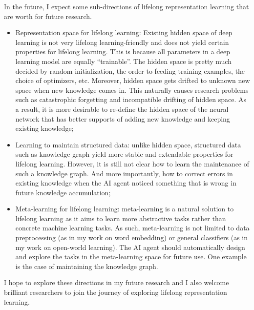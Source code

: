 \documentclass{uicthesi}
\newcounter{problem}
\begin{document}
In the future, I expect some sub-directions of lifelong representation learning that are worth for future research.
\begin{itemize}
\item Representation space for lifelong learning: 
Existing hidden space of deep learning is not very lifelong learning-friendly and does not yield certain properties for lifelong learning. 
This is because all parameters in a deep learning model are equally ``trainable''.
The hidden space is pretty much decided by random initialization, the order to feeding training examples, the choice of optimizers, etc.
Moreover, hidden space gets drifted to unknown new space when new knowledge comes in.
This naturally causes research problems such as catastrophic forgetting and incompatible drifting of hidden space.
As a result, it is more desirable to re-define the hidden space of the neural network that has better supports of adding new knowledge and keeping existing knowledge; 
\item Learning to maintain structured data: unlike hidden space, structured data such as knowledge graph yield more stable and extendable properties for lifelong learning. However, it is still not clear how to learn the maintenance of such a knowledge graph. And more importantly, how to correct errors in existing knowledge when the AI agent noticed something that is wrong in future knowledge accumulation;
\item Meta-learning for lifelong learning: meta-learning is a natural solution to lifelong learning as it aims to learn more abstractive tasks rather than concrete machine learning tasks. As such, meta-learning is not limited to data preprocessing (as in my work on word embedding) or general classifiers (as in my work on open-world learning). The AI agent should automatically design and explore the tasks in the meta-learning space for future use.
One example is the case of maintaining the knowledge graph.
\end{itemize}
I hope to explore these directions in my future research and I also welcome brilliant researchers to join the journey of exploring lifelong representation learning. 

\appendices
\newpage
\appendix


\end{document}
